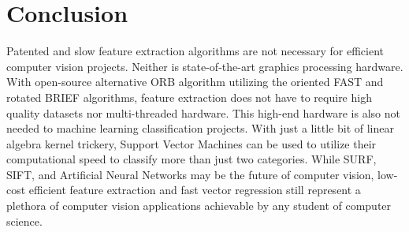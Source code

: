 \documentclass[stu,hidelinks,floatsintext,donotrepeattitle]{apa7}
\begin{document}
\section{Conclusion}
Patented and slow feature extraction algorithms are not necessary for efficient computer vision projects. Neither is state-of-the-art graphics processing hardware. With open-source alternative ORB algorithm utilizing the oriented FAST and rotated BRIEF algorithms, feature extraction does not have to require high quality datasets nor multi-threaded hardware. This high-end hardware is also not needed to machine learning classification projects. With just a little bit of linear algebra kernel trickery, Support Vector Machines can be used to utilize their computational speed to classify more than just two categories. While SURF, SIFT, and Artificial Neural Networks may be the future of computer vision, low-cost efficient feature extraction and fast vector regression still represent a plethora of computer vision applications achievable by any student of computer science.
\printbibliography
\end{document}
